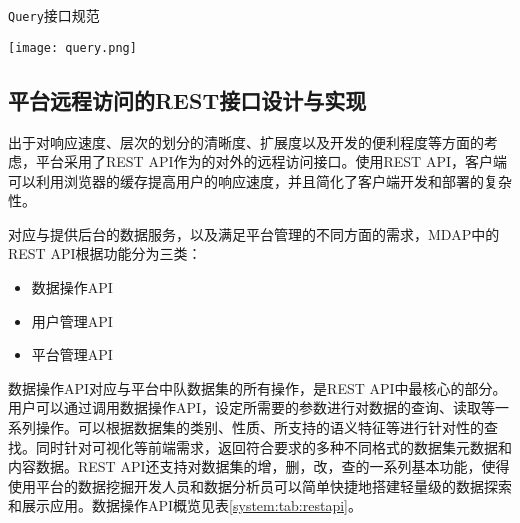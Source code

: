 \begin{table}[htbp]
  \centering 
   \caption{\texttt{Query}接口规范}
    \texttt{[image: query.png]}
  \label{system:fig:query}
\end{table}

\subsection{平台远程访问的REST接口设计与实现}
\label{system:sec:restapi}

出于对响应速度、层次的划分的清晰度、扩展度以及开发的便利程度等方面的考虑，平台采用了REST API作为的对外的远程访问接口\cite{pautasso2008restful}。使用REST API，客户端可以利用浏览器的缓存提高用户的响应速度，并且简化了客户端开发和部署的复杂性。

对应与提供后台的数据服务，以及满足平台管理的不同方面的需求，MDAP中的REST API根据功能分为三类：
\begin{itemize}
  \item 数据操作API
  \item 用户管理API
  \item 平台管理API
\end{itemize}

数据操作API对应与平台中队数据集的所有操作，是REST API中最核心的部分。用户可以通过调用数据操作API，设定所需要的参数进行对数据的查询、读取等一系列操作。可以根据数据集的类别、性质、所支持的语义特征等进行针对性的查找。同时针对可视化等前端需求，返回符合要求的多种不同格式的数据集元数据和内容数据。REST API还支持对数据集的增，删，改，查的一系列基本功能，使得使用平台的数据挖掘开发人员和数据分析员可以简单快捷地搭建轻量级的数据探索和展示应用。数据操作API概览见表\ref{system:tab:restapi}。
 
